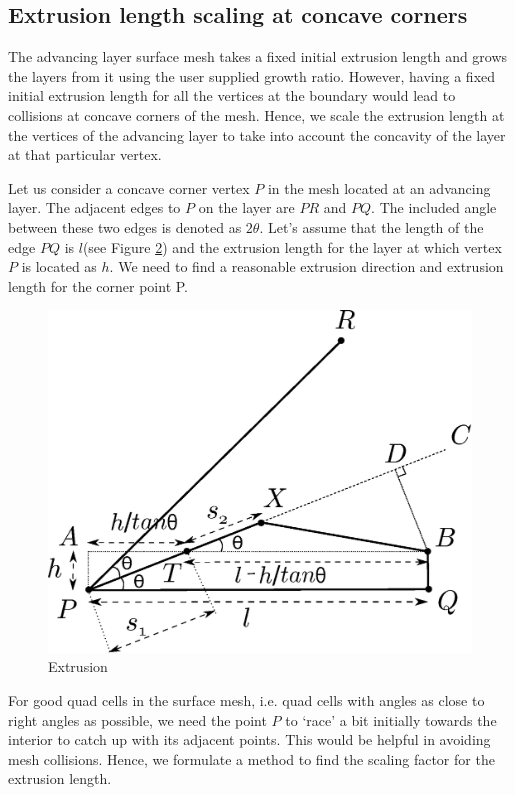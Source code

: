 \documentclass[conf]{new-aiaa}
\begin{document}
\begin{figure}[hbt!]
\label{interior-vert-collapse}
\end{figure}

\subsection{Extrusion length scaling at concave corners}
The advancing layer surface mesh takes a fixed initial extrusion length and grows the layers from it using the user supplied growth ratio. However, having a fixed initial extrusion length for all the vertices at the boundary would lead to collisions at concave corners of the mesh. Hence, we scale the extrusion length at the vertices of the advancing layer to take into account the concavity of the layer at that particular vertex.

Let us consider a concave corner vertex $P$ in the mesh located at an advancing layer. The adjacent edges to $P$ on the layer are $PR$ and $PQ$. The included angle between these two edges is denoted as $2\theta$. Let's assume that the length of the edge $PQ$ is $l$(see Figure \ref{fig:basic-diagram-extrusion-factor}) and the extrusion length for the layer at which vertex $P$ is located as $h$. We need to find a reasonable extrusion direction and extrusion length for the corner point P.

\begin{figure}[hbt!]
    \centering
    \includegraphics[width=.5\linewidth]{extrusionScaling/extrusionScaling.eps}
    \caption{Extrusion }
    \label{fig:basic-diagram-extrusion-factor}
\end{figure}

For good quad cells in the surface mesh, i.e. quad cells with angles as close to right angles as possible, we need the point $P$ to `race' a bit initially towards the interior to catch up with its adjacent points. This would be helpful in avoiding mesh collisions. Hence, we formulate a method to find the scaling factor for the extrusion length.
\end{document}
